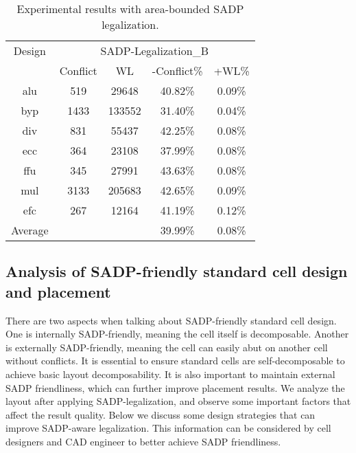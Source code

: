 \begin{table}[htbp]
\caption{Experimental results with area-bounded SADP legalization.}
\begin{center}
\begin{tabular}{c|c|c|c|c}
\hline
\multicolumn{ 1}{c|}{Design} & \multicolumn{ 4}{c}{SADP-Legalization\_B} \\ \cline{ 2- 5}
\multicolumn{ 1}{c|}{} & Conflict & WL & -Conflict\% & +WL\% \\ \hline
alu & 519 & 29648 & 40.82\% & 0.09\% \\ 
byp & 1433 & 133552 & 31.40\% & 0.04\% \\ 
div & 831 & 55437 & 42.25\% & 0.08\% \\ 
ecc & 364 & 23108 & 37.99\% & 0.08\% \\ 
ffu & 345 & 27991 & 43.63\% & 0.08\% \\ 
mul & 3133 & 205683 & 42.65\% & 0.09\% \\ 
efc & 267 & 12164 & 41.19\% & 0.12\% \\ \hline
Average &  &  & 39.99\% & 0.08\% \\ \hline
\end{tabular}
\end{center}
\label{tab:res_b}
\end{table}



\subsection{Analysis of SADP-friendly standard cell design and placement}
There are two aspects when talking about SADP-friendly standard cell design. One is internally SADP-friendly, meaning the cell itself is decomposable. Another is externally SADP-friendly, meaning the cell can easily abut on another cell without conflicts. It is essential to ensure standard cells are self-decomposable to achieve basic layout decomposability. It is also important to maintain external SADP friendliness, which can further improve placement results. We analyze the layout after applying SADP-legalization, and observe some important factors that affect the result quality. Below we discuss some design strategies that can improve SADP-aware legalization. This information can be considered by cell designers and CAD engineer to better achieve SADP friendliness.

